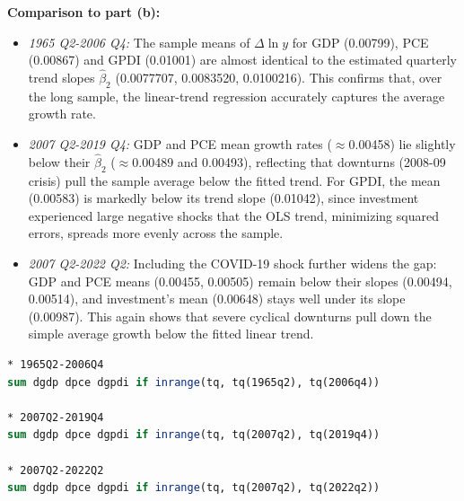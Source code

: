 \documentclass[a4paper,12pt]{article} %
\theoremstyle{nonitalic}
\newenvironment{solution}[1]
  {\renewcommand\theinnercustomsol{#1}%
   \innercustomsol}
  {\endinnercustomsol}
\newcounter{solutionctr}[section]
\renewcommand{\thesolutionctr}{(\alph{solutionctr})}
\newenvironment{autosolution}
  {\refstepcounter{solutionctr}%
   \begin{solution}{\thesolutionctr}}
  {\end{solution}}
\begin{document}
\begin{autosolution}
    \textbf{Comparison to part (b):}
    \begin{itemize}
        \item \emph{1965 Q2-2006 Q4:} The sample means of $\Delta\ln y$ for GDP (0.00799), PCE (0.00867) and GPDI (0.01001) are almost identical to the estimated quarterly trend slopes $\hat\beta_2$ (0.0077707, 0.0083520, 0.0100216). 
        This confirms that, over the long sample, the linear-trend regression accurately captures the average growth rate.
        \item \emph{2007 Q2-2019 Q4:} GDP and PCE mean growth rates ($\approx$0.00458) lie slightly below their $\hat\beta_2$ ($\approx$0.00489 and 0.00493), reflecting that downturns (2008-09 crisis) pull the sample average below the fitted trend. 
        For GPDI, the mean (0.00583) is markedly below its trend slope (0.01042), since investment experienced large negative shocks that the OLS trend, minimizing squared errors, spreads more evenly across the sample.
        \item \emph{2007 Q2-2022 Q2:} Including the COVID-19 shock further widens the gap: GDP and PCE means (0.00455, 0.00505) remain below their slopes (0.00494, 0.00514), and investment's mean (0.00648) stays well under its slope (0.00987). 
        This again shows that severe cyclical downturns pull down the simple average growth below the fitted linear trend.
    \end{itemize}
    \begin{lstlisting}[language=Stata]
* 1965Q2-2006Q4
sum dgdp dpce dgpdi if inrange(tq, tq(1965q2), tq(2006q4))

* 2007Q2-2019Q4
sum dgdp dpce dgpdi if inrange(tq, tq(2007q2), tq(2019q4))

* 2007Q2-2022Q2
sum dgdp dpce dgpdi if inrange(tq, tq(2007q2), tq(2022q2))
    \end{lstlisting}
\end{autosolution}
\end{document}
